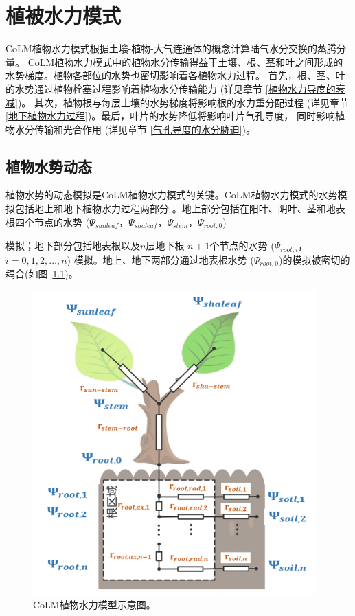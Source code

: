 \chapter{植被水力模式}

CoLM植物水力模式根据土壤-植物-大气连通体的概念计算陆气水分交换的蒸腾分量。
CoLM植物水力模式中的植物水分传输得益于土壤、根、茎和叶之间形成的水势梯度。植物各部位的水势也密切影响着各植物水力过程。
首先，根、茎、叶的水势通过植物栓塞过程影响着植物水分传输能力 (详见章节 \ref{植物水力导度的衰减})。
其次，植物根与每层土壤的水势梯度将影响根的水力重分配过程 (详见章节 \ref{地下植物水力过程})。最后，叶片的水势降低将影响叶片气孔导度，
同时影响植物水分传输和光合作用 (详见章节 \ref{气孔导度的水分胁迫})。


\section{植物水势动态}\label{植物水势动态}
植物水势的动态模拟是CoLM植物水力模式的关键。CoLM植物水力模式的水势模拟包括地上和地下植物水力过程两部分
。地上部分包括在阳叶、阴叶、茎和地表根四个节点的水势 ($\Psi_{sunleaf}$，$\Psi_{shaleaf}$，$\Psi_{stem}$，$\Psi_{root,0}$)

 模拟；地下部分包括地表根以及$n$层地下根 $n+1$个节点的水势 ($\Psi_{root,i}$，$i=0,1,2,\ldots,n$) 模拟。地上、地下两部分通过地表根水势
 ($\Psi_{root,0}$)的模拟被密切的耦合(如图~\ref{fig:CoLM植物水力模型示意图})。

 {
\begin{figure}[htbp]
\centering
\includegraphics{Figures/植被水力模式/CoLM植物水力模型示意图.png}
\caption{CoLM植物水力模型示意图。}
\label{fig:CoLM植物水力模型示意图}
\end{figure}
}



